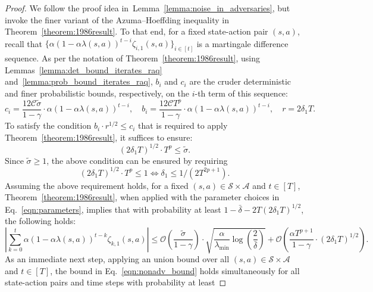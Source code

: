 \documentclass{article}
\begin{document}
\begin{proof}
   We follow the proof idea in~Lemma~\ref{lemma:noise_in_adversaries}, but invoke the finer variant of the Azuma–Hoeffding inequality in Theorem~\ref{theorem:1986result}. To that end, for a fixed state-action pair $(s,a)$, recall that \(\{\alpha (1 - \alpha \lambda(s,a))^{t - i} \zeta_{i,1}(s,a)\}_{i \in [t]}\) is a martingale difference sequence. As per the notation of Theorem~\ref{theorem:1986result}, using Lemmas~\ref{lemma:det_bound_iterates_raq} and~\ref{lemma:prob_bound_iterates_raq}, $b_i$ and $c_i$ are the cruder deterministic and finer probabilistic bounds, respectively, on the $i$-th term of this sequence: 
\begin{equation}\label{eqn:parameters}
c_i = \frac{12\mathcal{C} \tilde{\sigma}}{1 - \gamma} \cdot \alpha (1 - \alpha \lambda(s,a))^{t - i}, \quad 
b_i = \frac{12\mathcal{C} T^p}{1 - \gamma} \cdot \alpha (1 - \alpha \lambda(s,a))^{t - i}, \quad 
r = 2 \delta_1 T.
\end{equation}
To satisfy the condition \(b_i \cdot r^{1/2} \leq c_i\) that is required to apply Theorem~\ref{theorem:1986result}, it suffices to ensure:
\begin{equation}
(2 \delta_1 T)^{1/2} \cdot T^p \leq \tilde{\sigma}.
\end{equation}
Since \(\tilde{\sigma} \geq 1\), the above condition can be ensured by requiring
\begin{equation}\label{eqn:requirement_1}
(2 \delta_1 T)^{1/2} \cdot T^p \leq 1 \iff \delta_1 \leq 1/(2T^{2p+1}).
\end{equation}
 Assuming the above requirement holds, for a fixed \((s,a) \in \mathcal{S} \times \mathcal{A}\) and \(t \in [T]\), Theorem~\ref{theorem:1986result}, when applied with the parameter choices in Eq.~\eqref{eqn:parameters}, implies that with probability at least \(1 - \bar{\delta} - 2T (2 \delta_1 T)^{1/2}\), the following holds:
\begin{equation} \label{eqn:nonadv_bound}
\left| \sum_{k=0}^{t} \alpha (1 - \alpha \lambda(s,a))^{t - k} \zeta_{k,1}(s,a) \right|
\leq 
\mathcal{O}\left( \frac{ \tilde{\sigma} }{1 - \gamma} \right) 
\cdot \sqrt{ \frac{ \alpha }{ \lambda_{\min} } \log \left( \frac{2}{\bar{\delta}} \right)} 
+ \mathcal{O} \left( \frac{ \alpha T^{p+1} }{1 - \gamma} \cdot (2 \delta_1 T)^{1/2} \right).
\end{equation}
As an immediate next step, applying an union bound over all \((s,a) \in \mathcal{S} \times \mathcal{A}\) and \(t \in [T]\), the bound in Eq.~\eqref{eqn:nonadv_bound} holds simultaneously for all state-action pairs and time steps with probability at least 

\end{proof}
\end{document}
